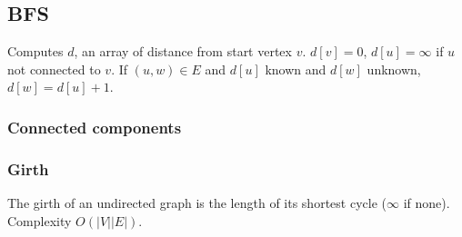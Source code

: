 \subsection{BFS}
Computes $d$, an array of distance from start vertex $v$.
$d[v]=0$, $d[u]=\infty$ if $u$ not connected to $v$. If $(u, w)\in E$ and $d[u]$ known and $d[w]$ unknown, $d[w] = d[u]+1$.\\

\subsubsection{Connected components}

\subsubsection{Girth}
The girth of an undirected graph is the length of its shortest cycle ($\infty$ if none). Complexity $O(|V| |E|)$. \\



